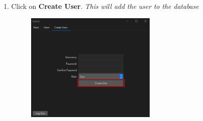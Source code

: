 \begin{enumerate}
    \item Click on \textbf{Create User}. \textit{This will add the user to the database}
    \begin{figure}[H]
        \centering
        \includegraphics[width=0.6\textwidth]{CreateUserTab/CreateUser/createUserCreate.PNG}
    \end{figure}
\end{enumerate}